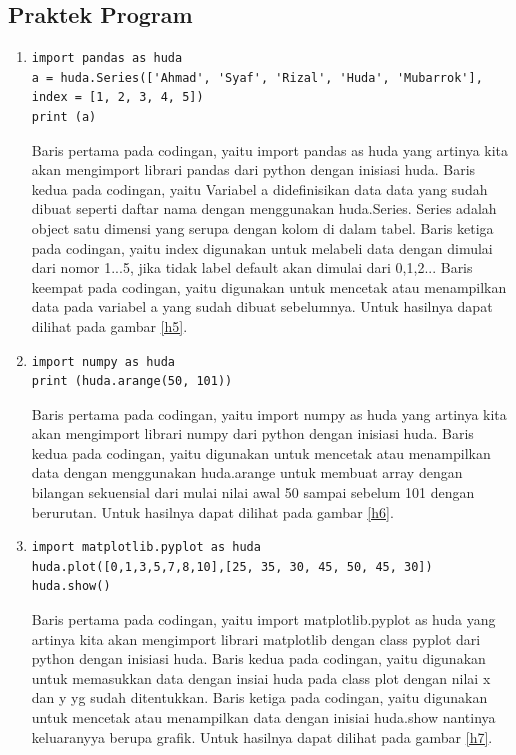 \subsection{Praktek Program}
\begin{enumerate}
\item 
\begin{verbatim}
import pandas as huda
a = huda.Series(['Ahmad', 'Syaf', 'Rizal', 'Huda', 'Mubarrok'],
index = [1, 2, 3, 4, 5])
print (a)
\end{verbatim}
\subitem Baris pertama pada codingan, yaitu import pandas as huda yang artinya kita akan mengimport librari pandas dari python dengan inisiasi huda.
\subitem Baris kedua pada codingan, yaitu Variabel a didefinisikan data data yang sudah dibuat seperti daftar nama dengan menggunakan huda.Series. Series adalah object satu dimensi yang serupa dengan kolom di dalam tabel.
\subitem Baris ketiga pada codingan, yaitu index digunakan untuk melabeli data dengan dimulai dari nomor 1...5, jika tidak label default akan dimulai dari 0,1,2...
\subitem Baris keempat pada codingan, yaitu digunakan untuk mencetak atau menampilkan data pada variabel a yang sudah dibuat sebelumnya.
\subitem Untuk hasilnya dapat dilihat pada gambar \ref{h5}.
\item 
\begin{verbatim}
import numpy as huda
print (huda.arange(50, 101)) 
\end{verbatim}
\subitem Baris pertama pada codingan, yaitu import numpy as huda yang artinya kita akan mengimport librari numpy dari python dengan inisiasi huda.
\subitem Baris kedua pada codingan, yaitu digunakan untuk mencetak atau menampilkan data dengan menggunakan huda.arange untuk membuat array dengan bilangan sekuensial dari mulai nilai awal 50 sampai sebelum 101 dengan berurutan.
\subitem Untuk hasilnya dapat dilihat pada gambar \ref{h6}.
\item 
\begin{verbatim}
import matplotlib.pyplot as huda
huda.plot([0,1,3,5,7,8,10],[25, 35, 30, 45, 50, 45, 30])
huda.show()
\end{verbatim}
\subitem Baris pertama pada codingan, yaitu import matplotlib.pyplot as huda yang artinya kita akan mengimport librari matplotlib dengan class pyplot dari python dengan inisiasi huda.
\subitem Baris kedua pada codingan, yaitu digunakan untuk memasukkan data dengan insiai huda pada class plot dengan nilai x dan y yg sudah ditentukkan.
\subitem Baris ketiga pada codingan, yaitu digunakan untuk mencetak atau menampilkan data dengan inisiai huda.show nantinya keluaranyya berupa grafik.
\subitem Untuk hasilnya dapat dilihat pada gambar \ref{h7}.


\end{enumerate}
